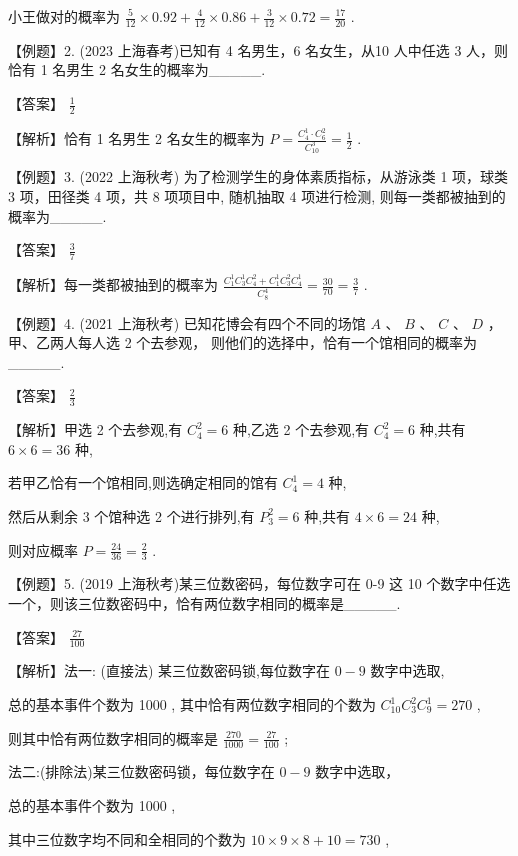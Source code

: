 \documentclass[10pt]{article}
\begin{document}
小王做对的概率为 \(\frac{5}{12} \times  {0.92} + \frac{4}{12} \times  {0.86} + \frac{3}{12} \times  {0.72} = \frac{17}{20}\) .

【例题】2. (2023 上海春考)已知有 4 名男生，6 名女生，从10 人中任选 3 人，则恰有 1 名男生 2 名女生的概率为\_\_\_\_\_.

【答案】 \(\frac{1}{2}\)

【解析】恰有 1 名男生 2 名女生的概率为 \(P = \frac{{C}_{4}^{1} \cdot  {C}_{6}^{2}}{{C}_{10}^{3}} = \frac{1}{2}\) .

【例题】3. (2022 上海秋考) 为了检测学生的身体素质指标，从游泳类 1 项，球类 3 项，田径类 4 项，共 8 项项目中, 随机抽取 4 项进行检测, 则每一类都被抽到的概率为\_\_\_\_\_.

【答案】 \(\frac{3}{7}\)

【解析】每一类都被抽到的概率为 \(\frac{{C}_{1}^{1}{C}_{3}^{1}{C}_{4}^{2} + {C}_{1}^{1}{C}_{3}^{2}{C}_{4}^{1}}{{C}_{8}^{4}} = \frac{30}{70} = \frac{3}{7}\) .

【例题】4. (2021 上海秋考) 已知花博会有四个不同的场馆 \(A\text{ 、 }B\text{ 、 }C\text{ 、 }D\) ，甲、乙两人每人选 2 个去参观， 则他们的选择中，恰有一个馆相同的概率为\_\_\_\_\_.

【答案】 \(\frac{2}{3}\)

【解析】甲选 2 个去参观,有 \({C}_{4}^{2} = 6\) 种,乙选 2 个去参观,有 \({C}_{4}^{2} = 6\) 种,共有 \(6 \times  6 = {36}\) 种,

若甲乙恰有一个馆相同,则选确定相同的馆有 \({C}_{4}^{1} = 4\) 种,

然后从剩余 3 个馆种选 2 个进行排列,有 \({P}_{3}^{2} = 6\) 种,共有 \(4 \times  6 = {24}\) 种,

则对应概率 \(P = \frac{24}{36} = \frac{2}{3}\) .

【例题】5. (2019 上海秋考)某三位数密码，每位数字可在 0-9 这 10 个数字中任选一个，则该三位数密码中，恰有两位数字相同的概率是\_\_\_\_\_.

【答案】 \(\frac{27}{100}\)

【解析】法一: (直接法) 某三位数密码锁,每位数字在 \(0 - 9\) 数字中选取,

总的基本事件个数为 1000 , 其中恰有两位数字相同的个数为 \({C}_{10}^{1}{C}_{3}^{2}{C}_{9}^{1} = {270}\) ,

则其中恰有两位数字相同的概率是 \(\frac{270}{1000} = \frac{27}{100}\) ;

法二:(排除法)某三位数密码锁，每位数字在 \(0 - 9\) 数字中选取，

总的基本事件个数为 1000 ,

其中三位数字均不同和全相同的个数为 \({10} \times  9 \times  8 + {10} = {730}\) ,
\end{document}
